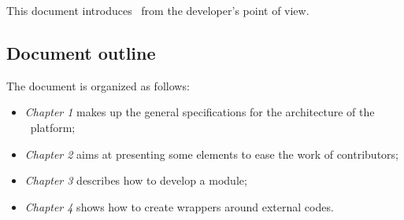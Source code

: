
This document introduces \OT\ from the developer's point of view.

\subsection*{Document outline}
The document is organized as follows:
\begin{itemize}
\item \emph{Chapter 1} makes up the general specifications for the architecture of the \OT\ platform;
\item \emph{Chapter 2} aims at presenting some elements to ease the work of contributors;
\item \emph{Chapter 3} describes how to develop a module;
\item \emph{Chapter 4} shows how to create wrappers around external codes.
\end{itemize}

